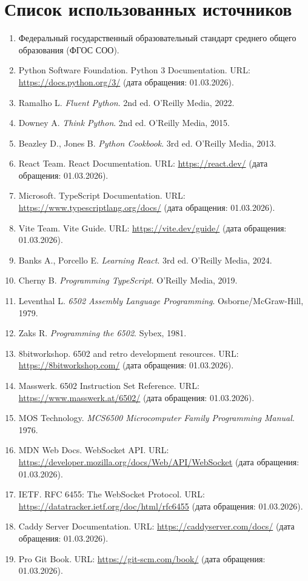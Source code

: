 \documentclass[12pt,a4paper]{article}
\begin{document}
\newpage
\section*{Список использованных источников}

\begin{enumerate}
  \item Федеральный государственный образовательный стандарт среднего общего образования (ФГОС СОО).
  \item Python Software Foundation. Python 3 Documentation. URL: \url{https://docs.python.org/3/} (дата обращения: 01.03.2026).
  \item Ramalho L. \textit{Fluent Python}. 2nd ed. O'Reilly Media, 2022.
  \item Downey A. \textit{Think Python}. 2nd ed. O'Reilly Media, 2015.
  \item Beazley D., Jones B. \textit{Python Cookbook}. 3rd ed. O'Reilly Media, 2013.
  \item React Team. React Documentation. URL: \url{https://react.dev/} (дата обращения: 01.03.2026).
  \item Microsoft. TypeScript Documentation. URL: \url{https://www.typescriptlang.org/docs/} (дата обращения: 01.03.2026).
  \item Vite Team. Vite Guide. URL: \url{https://vite.dev/guide/} (дата обращения: 01.03.2026).
  \item Banks A., Porcello E. \textit{Learning React}. 3rd ed. O'Reilly Media, 2024.
  \item Cherny B. \textit{Programming TypeScript}. O'Reilly Media, 2019.
  \item Leventhal L. \textit{6502 Assembly Language Programming}. Osborne/McGraw-Hill, 1979.
  \item Zaks R. \textit{Programming the 6502}. Sybex, 1981.
  \item 8bitworkshop. 6502 and retro development resources. URL: \url{https://8bitworkshop.com/} (дата обращения: 01.03.2026).
  \item Masswerk. 6502 Instruction Set Reference. URL: \url{https://www.masswerk.at/6502/} (дата обращения: 01.03.2026).
  \item MOS Technology. \textit{MCS6500 Microcomputer Family Programming Manual}. 1976.
  \item MDN Web Docs. WebSocket API. URL: \url{https://developer.mozilla.org/docs/Web/API/WebSocket} (дата обращения: 01.03.2026).
  \item IETF. RFC 6455: The WebSocket Protocol. URL: \url{https://datatracker.ietf.org/doc/html/rfc6455} (дата обращения: 01.03.2026).
  \item Caddy Server Documentation. URL: \url{https://caddyserver.com/docs/} (дата обращения: 01.03.2026).
  \item Pro Git Book. URL: \url{https://git-scm.com/book/} (дата обращения: 01.03.2026).
\end{enumerate}
\end{document}
